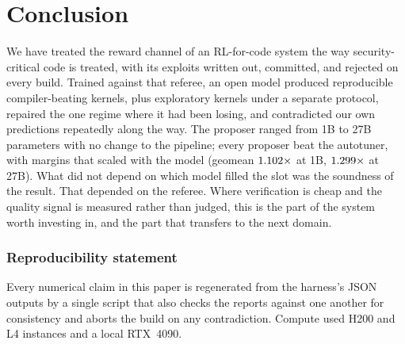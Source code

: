 \documentclass[10pt]{article}
\begin{document}
\section{Conclusion}

We have treated the reward channel of an RL-for-code system the way security-critical code
is treated, with its exploits written out, committed, and rejected on every build. Trained
against that referee, an open model produced \stabOps{} reproducible compiler-beating
kernels, plus \numKernelsExplore{} exploratory kernels under a separate protocol, repaired
the one regime where it had been losing, and contradicted our own predictions repeatedly
along the way. The proposer ranged from 1B to
27B parameters with no change to the pipeline; every proposer beat the autotuner, with
margins that scaled with the model (geomean $1.102\times$ at 1B,
$1.299\times$ at 27B). What did not depend on which model filled the slot was the
soundness of the result. That depended on the referee. Where verification is cheap and the quality signal is
measured rather than judged, this is the part of the system worth investing in, and the part
that transfers to the next domain.

\subsubsection*{Reproducibility statement}
Every numerical claim in this paper is regenerated from the harness's JSON outputs by a
single script that also checks the reports against one another for consistency and aborts
the build on any contradiction. Compute used H200 and L4 instances and a local RTX~4090.
\end{document}
